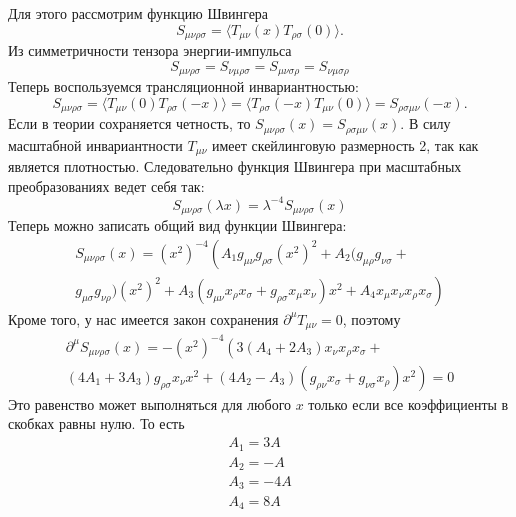 \documentclass[a4paper,12pt]{article}
\theoremstyle{definition}
\theoremstyle{definition}
\theoremstyle{definition}
\begin{document}
Для этого рассмотрим функцию Швингера
\begin{equation}
  \label{eq:214}
  S_{\mu\nu\rho\sigma}=\langle T_{\mu\nu}(x) T_{\rho\sigma}(0)\rangle.
\end{equation}
Из симметричности тензора энергии-импульса
\begin{equation}
  \label{eq:215}
  S_{\mu\nu\rho\sigma}=S_{\nu\mu\rho\sigma}=S_{\mu\nu\sigma\rho}=S_{\nu\mu\sigma\rho}
\end{equation}
Теперь воспользуемся трансляционной инвариантностью:
\begin{equation}
  \label{eq:216}
  S_{\mu\nu\rho\sigma}=\langle T_{\mu\nu}(0)T_{\rho\sigma}(-x)\rangle =\langle T_{\rho\sigma}(-x) T_{\mu\nu}(0)\rangle = S_{\rho\sigma\mu\nu}(-x).
\end{equation}
Если в теории сохраняется четность, то $S_{\mu\nu\rho\sigma}(x)=S_{\rho\sigma\mu\nu}(x)$. В силу
масштабной инвариантности $T_{\mu\nu}$ имеет скейлинговую размерность 2, так как является
плотностью. Следовательно функция Швингера при масштабных преобразованиях ведет себя так: 
\begin{equation}
  \label{eq:217}
  S_{\mu\nu\rho\sigma}(\lambda x)=\lambda^{-4} S_{\mu\nu\rho\sigma}(x)
\end{equation}
Теперь можно записать общий вид функции Швингера:
\begin{multline}
  \label{eq:218}
  S_{\mu\nu\rho\sigma}(x)=(x^{2})^{-4} \left( A_{1}g_{\mu\nu} g_{\rho\sigma} (x^{2})^{2} + A_{2} (g_{\mu\rho}g_{\nu\sigma}\right. +\\
  \left. g_{\mu\sigma}g_{\nu\rho}) (x^{2})^{2} +A_{3} (g_{\mu\nu} x_{\rho}x_{\sigma} +g_{\rho\sigma}x_{\mu}x_{\nu})x^{2} +A_{4} x_{\mu}x_{\nu}x_{\rho}x_{\sigma}\right)
\end{multline}
Кроме того, у нас имеется закон сохранения $\partial^{\mu} T_{\mu\nu}=0$, поэтому
\begin{multline}
  \label{eq:219}
  \partial^{\mu}  S_{\mu\nu\rho\sigma}(x)=-(x^{2})^{-4} \left( 3(A_{4}+2 A_{3}) x_{\nu}x_{\rho}x_{\sigma}\right. +\\
  \left. (4 A_{1}+3 A_{3}) g_{\rho\sigma} x_{\nu} x^{2} +(4 A_{2} - A_{3}) (g_{\rho\nu}x_{\sigma}+g_{\nu\sigma}x_{\rho}) x^{2}\right)=0
\end{multline}
Это равенство может выполняться для любого $x$ только если все коэффициенты в скобках равны нулю. То есть
\begin{eqnarray}
  \label{eq:220}
  A_{1}=3 A\\
  A_{2}=-A\\
  A_{3}=-4 A\\
  A_{4}=8 A
\end{eqnarray}
\end{document}
